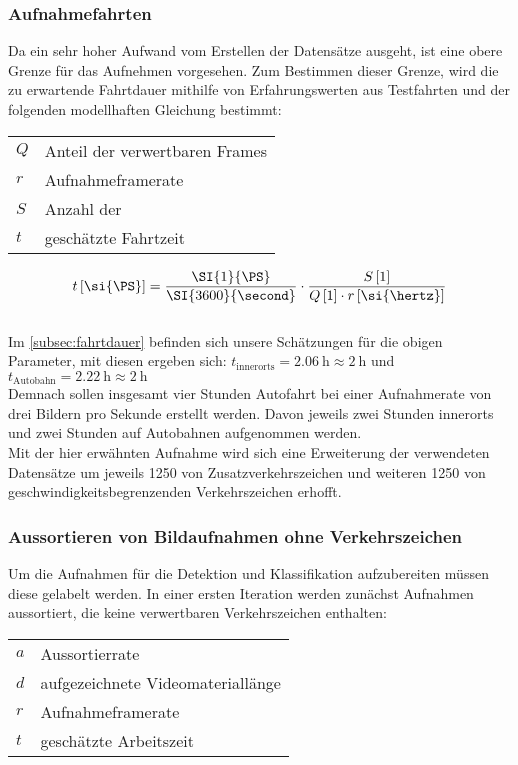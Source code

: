 \subsubsection{Aufnahmefahrten}
Da ein sehr hoher Aufwand vom Erstellen der Datensätze ausgeht, ist eine obere Grenze für das Aufnehmen vorgesehen. Zum Bestimmen dieser Grenze, wird die zu erwartende Fahrtdauer mithilfe von Erfahrungswerten aus Testfahrten und der folgenden modellhaften Gleichung bestimmt:
\begin{longtabu}{l X[j]}
$Q$ & Anteil der verwertbaren Frames\\
$r$ & Aufnahmeframerate\\
$S$ & Anzahl der \\
$t$ & geschätzte Fahrtzeit\\
\end{longtabu}
$$ t \left[\si{\PS}\right] = \frac{\SI{1}{\PS}}{\SI{3600}{\second}} \cdot \dfrac{S \left[1\right]}{Q\left[1\right] \cdot r \left[\si{\hertz}\right]} $$\\

Im \cref{subsec:fahrtdauer} befinden sich unsere Schätzungen für die obigen Parameter, mit diesen ergeben sich: $t_\text{innerorts} = \SI{2.06}{\hour} \approx \SI{2}{\hour}$ und $t_\text{Autobahn} = \SI{2.22}{\hour} \approx \SI{2}{\hour}$\\

Demnach sollen insgesamt vier Stunden Autofahrt bei einer Aufnahmerate von drei Bildern pro Sekunde erstellt werden.
Davon jeweils zwei Stunden innerorts und zwei Stunden auf Autobahnen aufgenommen werden.\\
Mit der hier erwähnten Aufnahme wird sich eine Erweiterung der verwendeten Datensätze um jeweils 1250  von Zusatzverkehrszeichen und weiteren 1250  von geschwindigkeitsbegrenzenden Verkehrszeichen erhofft.\\

\subsubsection{Aussortieren von Bildaufnahmen ohne Verkehrszeichen}
Um die Aufnahmen für die \gls{Detektion} und \gls{Klassifikation}  aufzubereiten müssen diese gelabelt werden. In einer ersten Iteration werden zunächst Aufnahmen aussortiert, die keine verwertbaren Verkehrszeichen enthalten:

\begin{longtabu}{l X[j]}
$a$ & Aussortierrate\\
$d$ & aufgezeichnete Videomateriallänge\\
$r$ & Aufnahmeframerate\\
$t$ & geschätzte Arbeitszeit\\
\end{longtabu}

